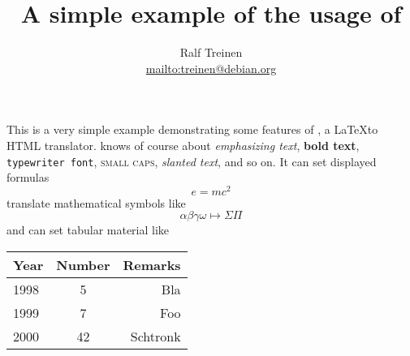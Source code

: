 \documentclass[11pt]{article}
\title{A simple example of the usage of \hevea}
\author{Ralf Treinen\\\url{mailto:treinen@debian.org}}
\begin{document}
\maketitle

This is a very simple example demonstrating some features of \hevea, a
\LaTeX to HTML translator. \hevea knows of course about
\emph{emphasizing text},  \textbf{bold text}, \texttt{typewriter font},
\textsc{small caps}, \textsl{slanted text}, and so on. It can set
displayed formulas
\[
e = mc^2
\]
translate mathematical symbols like
\[
\alpha\beta\gamma\omega \mapsto \Sigma\Pi
\]
and can set tabular material like
\begin{center}
\begin{tabular}{|l|cr|}
\hline
Year & Number & Remarks\\
\hline\hline
1998 & 5 & Bla\\
1999 & 7 & Foo\\
2000 &42 & Schtronk\\
\hline
\end{tabular}
\end{center}
\end{document}
